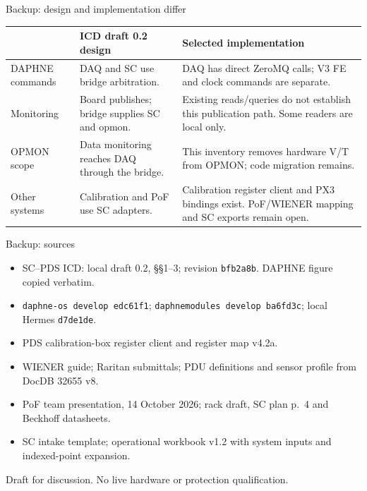 \documentclass[aspectratio=169,11pt]{beamer}
\begin{document}
\begin{frame}{Backup: design and implementation differ}
  \relax
  \small
  \renewcommand{\arraystretch}{1.35}
  \begin{tabularx}{\textwidth}{@{}p{2.7cm}XX@{}}
    \toprule
    & ICD draft 0.2 design & Selected implementation\\
    \midrule
    DAPHNE commands & DAQ and SC use bridge arbitration. & DAQ has direct ZeroMQ calls; V3 FE and clock commands are separate.\\
    Monitoring & Board publishes; bridge supplies SC and opmon. & Existing reads/queries do not establish this publication path. Some readers are local only.\\
    OPMON scope & Data monitoring reaches DAQ through the bridge. & This inventory removes hardware V/T from OPMON; code migration remains.\\
    Other systems & Calibration and PoF use SC adapters. & Calibration register client and PX3 bindings exist. PoF/WIENER mapping and SC exports remain open.\\
    \bottomrule
  \end{tabularx}\par
\end{frame}

\begin{frame}{Backup: sources}
  \relax
  \small
  \begin{itemize}
    \setlength{\itemsep}{0.45em}
    \item SC--PDS ICD: local draft 0.2, \S\S1--3; revision \texttt{bfb2a8b}. DAPHNE figure copied verbatim.
    \item \texttt{daphne-os develop edc61f1}; \texttt{daphnemodules develop ba6fd3c}; local Hermes \texttt{d7de1de}.
    \item PDS calibration-box register client and register map v4.2a.
    \item WIENER guide; Raritan submittals; PDU definitions and sensor profile from DocDB 32655 v8.
    \item PoF team presentation, 14 October 2026; rack draft, SC plan p.\ 4 and Beckhoff datasheets.
    \item SC intake template; operational workbook v1.2 with system inputs and indexed-point expansion.
  \end{itemize}
  \medskip
  Draft for discussion. No live hardware or protection qualification.
\end{frame}
\end{document}
